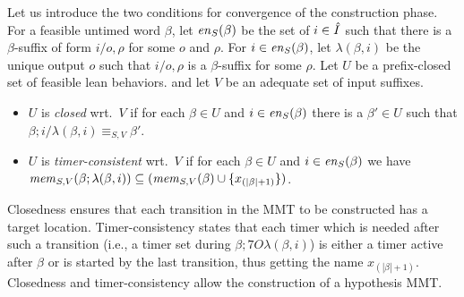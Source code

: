 Let us introduce the two conditions for convergence of the construction phase.
For a feasible untimed word $\beta$, let $\feasibleinputs{\beta}{S}$ be the
set of $i \in \extinputs$ such that there is a $\beta$-suffix of form
$i/o,\rho$ for some $o$ and $\rho$.
For $i \in \feasibleinputs{\beta}{S}$, let $\lambda(\beta,i)$ be the unique
output $o$ such that $i/o,\rho$ is a $\beta$-suffix for some $\rho$.
Let $U$ be a prefix-closed set of feasible lean behaviors.
and let $V$ be an adequate set of input suffixes.
\begin{itemize}
\item
$U$ is {\em closed} wrt.\ $V$ if 
  for each $\beta \in U$ and
  $i \in \feasibleinputs{\beta}{S}$
  there is a $\beta' \in U$ such that
  $\beta;i/\lambda(\beta,i) \equiv_{S,V} \beta'$.
\item
$U$ is {\em timer-consistent} wrt.\ $V$ if 
  for each $\beta \in U$ and
  $i \in \feasibleinputs{\beta}{S}$
  we have
  $\apprgetmemorable{S}{\beta;\lambda(\beta,i)}{V} \subseteq
  (\apprgetmemorable{S}{\beta}{V} \cup \set{x_{(|\beta|+1)}})$.
\end{itemize}
Closedness ensures that each transition in the MMT to be constructed has a target location. 
Timer-consistency states that each timer which is needed after such
a transition (i.e., a timer set during $\beta;7O\lambda(\beta,i)$)
is either a timer active after $\beta$ or is started by the last transition, thus
getting the name $x_{(|\beta|+1)}$.
Closedness and timer-consistency allow the construction of a hypothesis MMT.


